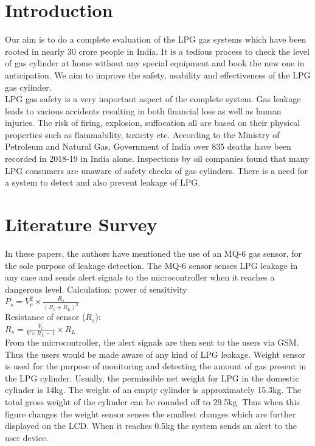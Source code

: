 \documentclass[conference]{IEEEtran}
\begin{document}
\section{Introduction}
Our aim is to do a complete evaluation of the LPG
gas systems which have been rooted in nearly 30
crore people in India.\cite{[8]} It is a tedious process to
check the level of gas cylinder at home without any
special equipment and book the new one in anticipation.
We aim to improve the safety, usability and effectiveness
of the LPG gas cylinder.\\

LPG gas safety is a very important aspect of the
complete system. Gas leakage leads to various accidents
resulting in both financial loss as well as human
injuries.\cite{[6]} The risk of firing, explosion, suffocation
all are based on their physical properties such as
flammability, toxicity etc. According to the Ministry
of Petroleum and Natural Gas, Government of India
over 835 deaths have been recorded in 2018-19 in
India alone.\cite{[7]} Inspections by oil companies found that
many LPG consumers are unaware of safety checks of gas
cylinders. There is a need for a system to detect and
also prevent leakage of LPG.

\section{Literature Survey}
In these papers, the authors have mentioned the
use of an MQ-6 gas sensor, for the sole purpose
of leakage detection.\cite{[1]} The MQ-6 sensor senses LPG
leakage in any case and sends alert signals to the
microcontroller when it reaches a dangerous level.
Calculation: power of sensitivity\\[0.3em]
$P_s = V_c^2 \times \frac{R_s}{(R_s+R_L)^2}$\\[0.3em]
Resistance of sensor ($R_s$):\\[0.3em]
$R_s=\frac{V_c}{V\times R_L - 1}\times R_L$ \cite{[3]}\cite{[4]}\\
From the microcontroller, the alert signals are then
sent to the users via GSM.\cite{[2]} Thus the users would be
made aware of any kind of LPG leakage. Weight sensor
is used for the purpose of monitoring and detecting
the amount of gas present in the LPG cylinder.\cite{[3]}
Usually, the permissible net weight for LPG in the
domestic cylinder is 14kg. The weight of an empty
cylinder is approximately 15.3kg. The total gross
weight of the cylinder can be rounded off to
29.5kg. Thus when this figure changes the weight
sensor senses the smallest changes which are
further displayed on the LCD. When it reaches
0.5kg the system sends an alert to the user
device.\cite{[4]}
\end{document}
